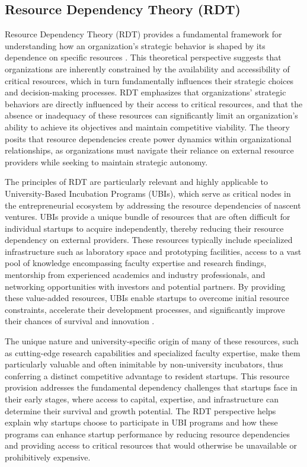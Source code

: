 \documentclass[../Main.tex]{subfiles}
\begin{document}
\subsection{Resource Dependency Theory (RDT)}

Resource Dependency Theory (RDT) provides a fundamental framework for understanding how an organization's strategic behavior is shaped by its dependence on specific resources \cite{pfeffer1978external}. This theoretical perspective suggests that organizations are inherently constrained by the availability and accessibility of critical resources, which in turn fundamentally influences their strategic choices and decision-making processes. RDT emphasizes that organizations' strategic behaviors are directly influenced by their access to critical resources, and that the absence or inadequacy of these resources can significantly limit an organization's ability to achieve its objectives and maintain competitive viability. The theory posits that resource dependencies create power dynamics within organizational relationships, as organizations must navigate their reliance on external resource providers while seeking to maintain strategic autonomy.

The principles of RDT are particularly relevant and highly applicable to University-Based Incubation Programs (UBIs), which serve as critical nodes in the entrepreneurial ecosystem by addressing the resource dependencies of nascent ventures. UBIs provide a unique bundle of resources that are often difficult for individual startups to acquire independently, thereby reducing their resource dependency on external providers. These resources typically include specialized infrastructure such as laboratory space and prototyping facilities, access to a vast pool of knowledge encompassing faculty expertise and research findings, mentorship from experienced academics and industry professionals, and networking opportunities with investors and potential partners. By providing these value-added resources, UBIs enable startups to overcome initial resource constraints, accelerate their development processes, and significantly improve their chances of survival and innovation \cite{mian1996assessing}.

The unique nature and university-specific origin of many of these resources, such as cutting-edge research capabilities and specialized faculty expertise, make them particularly valuable and often inimitable by non-university incubators, thus conferring a distinct competitive advantage to resident startups. This resource provision addresses the fundamental dependency challenges that startups face in their early stages, where access to capital, expertise, and infrastructure can determine their survival and growth potential. The RDT perspective helps explain why startups choose to participate in UBI programs and how these programs can enhance startup performance by reducing resource dependencies and providing access to critical resources that would otherwise be unavailable or prohibitively expensive.
\end{document}
